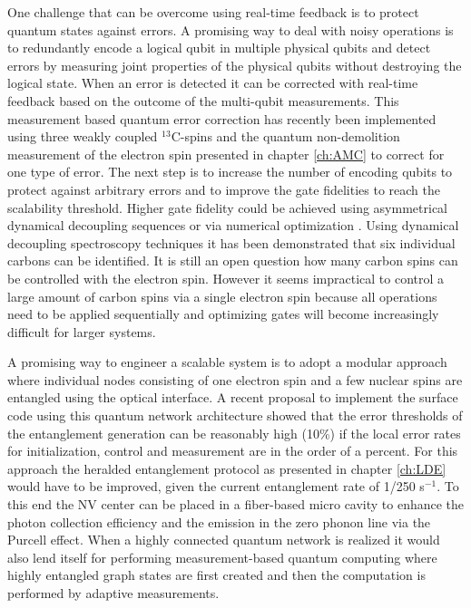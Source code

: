 One challenge that can be overcome using real-time feedback is to protect quantum states against errors. A promising way to deal with noisy operations is to redundantly encode a logical qubit in multiple physical qubits and detect errors by measuring joint properties of the physical qubits without destroying the logical state. When an error is detected it can be corrected with real-time feedback based on the outcome of the multi-qubit measurements. This measurement based quantum error correction has recently been implemented using three weakly coupled $^{13}$C-spins and the quantum non-demolition measurement of the electron spin presented in chapter \ref{ch:AMC} to correct for one type of error\cite{Cramer_arXiv_2015}. The next step is to increase the number of encoding qubits to protect against arbitrary errors and to improve the gate fidelities to reach the scalability threshold. Higher gate fidelity could be achieved using asymmetrical dynamical decoupling sequences\cite{Casanova_arXiv_2015} or via numerical optimization \cite{Liu_NatCommun_2013,Dolde_NatCommun_2014}. Using dynamical decoupling spectroscopy techniques it has been demonstrated that six individual carbons can be identified\cite{Taminiau_Phys.Rev.Lett._2012}. It is still an open question how many carbon spins can be controlled with the electron spin. However it seems impractical to control a large amount of carbon spins via a single electron spin because all operations need to be applied sequentially and optimizing gates will become increasingly difficult for larger systems.

A promising way to engineer a scalable system is to adopt a modular approach where individual nodes consisting of one electron spin and a few nuclear spins are entangled using the optical interface. A recent proposal to implement the surface code using this quantum network architecture showed that the error thresholds of the entanglement generation can be reasonably high (10\%) if the local error rates for initialization, control and measurement are in the order of a percent\cite{Nickerson_NatCommun_2013}. For this approach the heralded entanglement protocol as presented in chapter \ref{ch:LDE} would have to be improved, given the current entanglement rate of 1/250 s$^{-1}$. To this end the NV center can be placed in a fiber-based micro cavity to enhance the photon collection efficiency and the emission in the zero phonon line via the Purcell effect\cite{Kaupp_Phys.Rev.A_2013,Albrecht_Phys.Rev.Lett._2013,Janitz_arXiv_2015}. When a highly connected quantum network is realized it would also lend itself for performing measurement-based quantum computing\cite{Raussendorf_Phys.Rev.Lett._2001,Benjamin_Laser&Photon.Rev._2009} where highly entangled graph states are first created and then the computation is performed by adaptive measurements.

